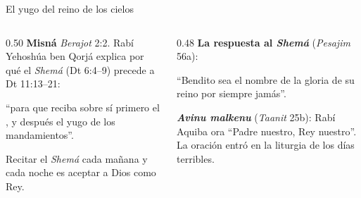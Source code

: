 \begin{frame}{El yugo del reino de los cielos}
\begin{columns}[t,onlytextwidth]
\begin{column}{0.50\textwidth}\small
\textbf{Misná} \emph{Berajot} 2:2. Rabí Yehoshúa ben Qorjá explica por qué el \emph{Shemá} (Dt 6:4--9) precede a Dt 11:13--21:
\begin{center}\end{center}
``para que reciba sobre sí primero el , y después el yugo de los mandamientos''.\par\smallskip
Recitar el \emph{Shemá} cada mañana y cada noche es aceptar a Dios como Rey.
\end{column}
\begin{column}{0.48\textwidth}\small
\textbf{La respuesta al \emph{Shemá}} (\emph{Pesajim} 56a):
\begin{center}\end{center}
``Bendito sea el nombre de la gloria de su reino por siempre jamás''.\par\smallskip
\textbf{\emph{Avinu malkenu}} (\emph{Taanit} 25b): Rabí Aquiba ora ``Padre nuestro, Rey nuestro''. La oración entró en la liturgia de los días terribles.
\end{column}
\end{columns}\par\smallskip
{}
\end{frame}

